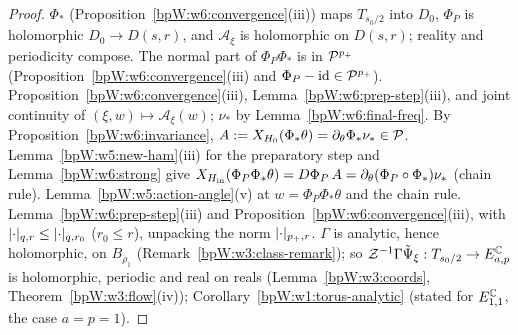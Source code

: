 \begin{proof}
\label{stepW:w6:t-hol} $\Phi_*$ (Proposition~\ref{bpW:w6:convergence}(iii)) maps $T_{s_0/2}$ into $D_0$, $\Phi_P$ is holomorphic $D_0\to D(s,r)$,
and $\mathcal A_\xi$ is holomorphic on $D(s,r)$; reality and periodicity compose. The normal part of $\Phi_P\Phi_*$ is in $\mathcal P^{p_+}$
(Proposition~\ref{bpW:w6:convergence}(iii) and $\Phi_P-\mathrm{id}\in\mathcal P^{p_+}$).
\label{stepW:w6:t-cont} Proposition~\ref{bpW:w6:convergence}(iii), Lemma~\ref{bpW:w6:prep-step}(iii), and joint continuity of
$(\xi,w)\mapsto\mathcal A_\xi(w)$; $\nu_*$ by Lemma~\ref{bpW:w6:final-freq}.
\label{stepW:w6:t-prep} By Proposition~\ref{bpW:w6:invariance}, $A:=X_{H_0}(\Phi_*\theta)=\partial_\theta\Phi_*\nu_*\in\mathcal P$.
Lemma~\ref{bpW:w5:new-ham}(iii) for the preparatory step and Lemma~\ref{bpW:w6:strong} give
$X_{H_{\rm in}}(\Phi_P\Phi_*\theta)=D\Phi_P\,A=\partial_\theta(\Phi_P\circ\Phi_*)\nu_*$ (chain rule).
\label{stepW:w6:t-bk} Lemma~\ref{bpW:w5:action-angle}(v) at $w=\Phi_P\Phi_*\theta$ and the chain rule.
\label{stepW:w6:t-close} Lemma~\ref{bpW:w6:prep-step}(iii) and Proposition~\ref{bpW:w6:convergence}(iii), with
$\lvert \cdot\rvert_{q,r}\le\lvert \cdot\rvert_{q,r_0}$ ($r_0\le r$), unpacking the norm $\lvert \cdot\rvert_{p_+,r}$.
\label{stepW:w6:t-an} $\Gamma$ is analytic, hence holomorphic, on $B_{\rho_1}$ (Remark~\ref{bpW:w3:class-remark}); so
$\mathcal Z^{-1}\Gamma\tilde\Psi_\xi:T_{s_0/2}\to E^{\mathbb{C}}_{a,p}$ is holomorphic, periodic and real on reals (Lemma~\ref{bpW:w3:coords},
Theorem~\ref{bpW:w3:flow}(iv)); Corollary~\ref{bpW:w1:torus-analytic} (stated for $E^{\mathbb{C}}_{1,1}$, the case $a=p=1$).
\end{proof}

